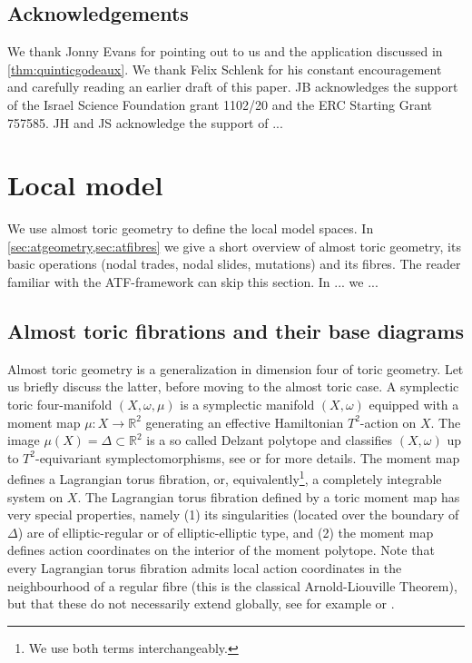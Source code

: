 \documentclass[12pt,a4paper,abstract=true,draft]{scrartcl}
\begin{document}
\subsection{Acknowledgements}
We thank Jonny Evans for pointing out to us \cite{EvaUrz21} and the application discussed in \cref{thm:quinticgodeaux}.
We thank Felix Schlenk for his constant encouragement and carefully reading an earlier draft of this paper.
JB acknowledges the support of the Israel Science Foundation grant 1102/20 and the ERC Starting Grant 757585.
JH and JS acknowledge the support of ... 


\section{Local model}
\label{sec:local_model}

We use almost toric geometry to define the local model spaces.
In \cref{sec:atgeometry,sec:atfibres} we give a short overview of almost toric geometry, its basic operations (nodal trades, nodal slides, mutations) and its fibres.
The reader familiar with the ATF-framework can skip this section.
In ... we ...


\subsection{Almost toric fibrations and their base diagrams}
\label{sec:atgeometry}

Almost toric geometry is a generalization in dimension four of toric geometry.
Let us briefly discuss the latter, before moving to the almost toric case.
A symplectic toric four-manifold $(X,\omega,\mu)$ is a symplectic manifold $(X,\omega)$ equipped with a moment map $\mu \colon X \rightarrow \mathbb{R}^2$ generating an effective Hamiltonian $T^2$-action on $X$.
The image $\mu(X) = \Delta \subset \mathbb{R}^2$ is a so called Delzant polytope and classifies $(X,\omega)$ up to $T^2$-equivariant symplectomorphisms, see \cite{Del88} or \cite{Can03} for more details.
The moment map defines a Lagrangian torus fibration, or, equivalently\footnote{We use both terms interchangeably.}, a completely integrable system on $X$.
The Lagrangian torus fibration defined by a toric moment map has very special properties, namely (1) its singularities (located over the boundary of $\Delta$) are of elliptic-regular or of elliptic-elliptic type, and (2) the moment map defines action coordinates on the interior of the moment polytope.
Note that every Lagrangian torus fibration admits local action coordinates in the neighbourhood of a regular fibre (this is the classical Arnold-Liouville Theorem), but that these do not necessarily extend globally, see for example \cite{Dui80} or \cite{Zun96,Zun03}.
\end{document}
